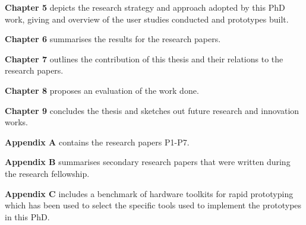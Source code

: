 \textbf{Chapter 5} depicts the research strategy and approach adopted by
this PhD work, giving and overview of the user studies conducted and
prototypes built.

\textbf{Chapter 6} summarises the results for the research papers.

\textbf{Chapter 7} outlines the contribution of this thesis and their
relations to the research papers.

\textbf{Chapter 8} proposes an evaluation of the work done.

\textbf{Chapter 9} concludes the thesis and sketches out future research
and innovation works.

\textbf{Appendix A} contains the research papers P1-P7.

\textbf{Appendix B} summarises secondary research papers that were
written during the research fellowship.

\textbf{Appendix C} includes a benchmark of hardware toolkits for rapid
prototyping which has been used to select the specific tools used to
implement the prototypes in this PhD.
